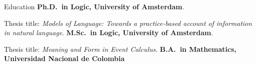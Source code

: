 \begin{rubric}{Education}
\entry*[2007 -- 2012]%
	\textbf{Ph.D.~in Logic, University of Amsterdam}.
	\par Thesis title: \emph{Models of Language: Towards a practice-based account of information in natural language}.
%
\entry*[2003 -- 2006]%
	\textbf{M.Sc.~in Logic, University of Amsterdam}.\par
	Thesis title: \emph{Meaning and Form in Event Calculus}.
% 
\entry*[1996 -- 2002]%
	\textbf{B.A.~in Mathematics, Universidad Nacional de Colombia}\par
\end{rubric}